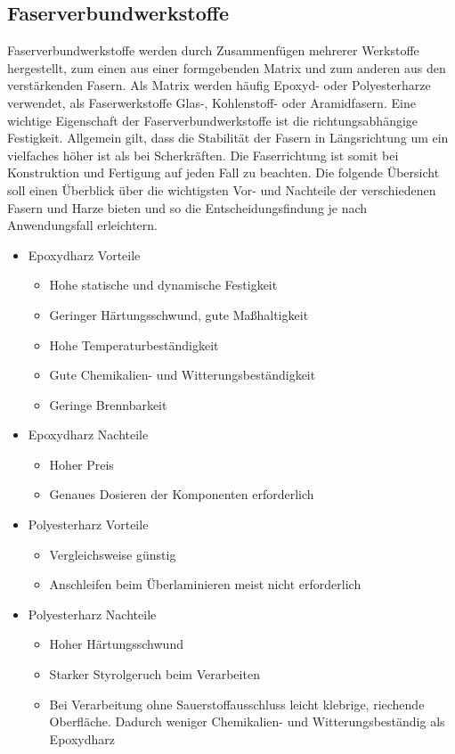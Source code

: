 \documentclass[paper=A4,pagesize,DIV=18, 12pt,listof=totoc,bibliography=totoc,headings=optiontohead,open=any]{article}
\begin{document}
\subsection{Faserverbundwerkstoffe}
Faserverbundwerkstoffe werden durch Zusammenfügen mehrerer Werkstoffe hergestellt, zum einen aus einer formgebenden Matrix und zum anderen aus den verstärkenden Fasern. Als Matrix werden häufig Epoxyd- oder Polyesterharze verwendet, als Faserwerkstoffe Glas-, Kohlenstoff- oder Aramidfasern. Eine wichtige Eigenschaft der Faserverbundwerkstoffe ist die richtungsabhängige Festigkeit. Allgemein gilt, dass die Stabilität der Fasern in Längsrichtung um ein vielfaches höher ist als bei Scherkräften. Die Faserrichtung ist somit bei Konstruktion und Fertigung auf jeden Fall zu beachten.  Die folgende Übersicht soll einen Überblick über die wichtigsten Vor- und Nachteile der verschiedenen Fasern und Harze bieten und so die Entscheidungsfindung je nach Anwendungsfall erleichtern.
\begin{itemize}
	\item Epoxydharz Vorteile
	\begin{itemize}
		\item Hohe statische und dynamische Festigkeit
		\item Geringer Härtungsschwund, gute Maßhaltigkeit
		\item Hohe Temperaturbeständigkeit
		\item Gute Chemikalien- und Witterungsbeständigkeit
		\item Geringe Brennbarkeit
	\end{itemize}
	\item Epoxydharz Nachteile
	\begin{itemize}
		\item Hoher Preis
		\item Genaues Dosieren der Komponenten erforderlich
	\end{itemize}
	\item Polyesterharz Vorteile	
	\begin{itemize}
		\item Vergleichsweise günstig
		\item Anschleifen beim Überlaminieren meist nicht erforderlich
	\end{itemize} 
	\item Polyesterharz Nachteile
	\begin{itemize}
		\item Hoher Härtungsschwund
		\item Starker Styrolgeruch beim Verarbeiten
		\item Bei Verarbeitung ohne Sauerstoffausschluss leicht klebrige, riechende Oberfläche. Dadurch weniger Chemikalien- und Witterungsbeständig als Epoxydharz
	\end{itemize}	 
\end{itemize}
\end{document}
